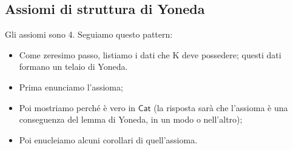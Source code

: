 \documentclass[11pt]{article}
\def\Cat{\mathsf{Cat}}
\theoremstyle{reference}
\begin{document}
\subsection{Assiomi di struttura di Yoneda}
\label{sec:org1708580}

Gli assiomi sono 4. Seguiamo questo pattern:

\begin{itemize}
\item Come zeresimo passo, listiamo i dati che K deve possedere;
questi dati formano un telaio di Yoneda.
\item Prima enunciamo l’assioma;
\item Poi mostriamo perché è vero in \(\Cat\) (la risposta sarà
che l’assioma è una conseguenza del lemma di Yoneda, in un
modo o nell’altro);
\item Poi enucleiamo alcuni corollari di quell’assioma.
\end{itemize}
\end{document}
